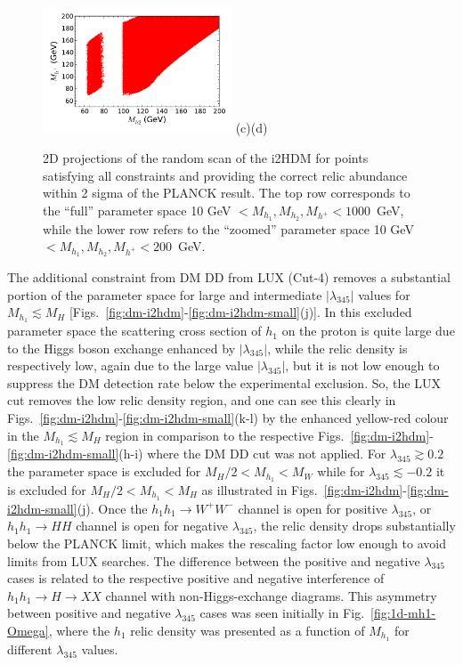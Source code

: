\documentclass[12pt,a4paper]{article}
\begin{document}
\begin{figure}[htb]
\hspace*{-0.2cm}\includegraphics[width=0.50\textwidth]{Mhc_Mh2_Omega_zoom-cut123456789_zz-monoc.pdf}
\vskip -0.8cm
\hspace*{1cm}(c)\hspace*{0.55\textwidth}\hspace*{-1.5cm}(d)
\caption{2D projections of the random scan of the i2HDM for points satisfying all constraints and providing the correct relic abundance within 2 sigma of the PLANCK result.
 The top row corresponds to the ``full'' parameter space 10 GeV $< M_{h_1}, M_{h_2}, M_{h^{+}} < 1000$~GeV,
 while the lower row refers to the ``zoomed'' parameter space
10 GeV $< M_{h_1}, M_{h_2}, M_{h^{+}} < 200$~GeV.}
\label{fig:dm-i2hdm-relic}
\end{figure}


The additional constraint from DM DD from LUX (Cut-4)
removes a substantial portion of the  parameter space for large and intermediate $|\lambda_{345}|$
values for $M_{h_1}\lesssim M_H$  [Figs.~\ref{fig:dm-i2hdm}-\ref{fig:dm-i2hdm-small}(j)].
In this excluded parameter space the scattering cross section of $h_1$ on the proton 
is quite large due to the Higgs boson exchange enhanced by $|\lambda_{345}|$, while the relic density is respectively low,
again due to the large value  $|\lambda_{345}|$, but it is not low enough to suppress
the DM detection rate below the experimental exclusion.
So, the LUX cut removes the low relic density region, 
and one can see this clearly in Figs.~\ref{fig:dm-i2hdm}-\ref{fig:dm-i2hdm-small}(k-l)
by the enhanced yellow-red colour in the $M_{h_1}\lesssim M_H$ region 
in comparison to the respective Figs.~\ref{fig:dm-i2hdm}-\ref{fig:dm-i2hdm-small}(h-i)
where the DM DD cut was not applied.
For $\lambda_{345} \gtrsim 0.2$ the parameter space is excluded
for $M_H/2<M_{h_1}<M_W$ while for  $\lambda_{345} \lesssim -0.2$
it is excluded for $M_H/2<M_{h_1}<M_H$ as illustrated in Figs.~\ref{fig:dm-i2hdm}-\ref{fig:dm-i2hdm-small}(j).
Once the $h_1 h_1 \to W^+ W^-$ channel is open for positive  $\lambda_{345}$,
or $h_1 h_1 \to H H$ channel is open for negative $\lambda_{345}$,
the relic density drops substantially below the PLANCK limit, which makes the rescaling factor 
low enough to avoid limits from LUX searches.
The difference between the positive and negative $\lambda_{345}$ cases
is related to the respective positive and negative interference of
$h_1 h_1 \to H \to X X$ channel with non-Higgs-exchange diagrams.
This asymmetry between positive and negative $\lambda_{345}$ cases was seen initially
in Fig.~\ref{fig:1d-mh1-Omega}, where the $h_1$ relic density was presented as a function 
of $M_{h_1}$ for different $\lambda_{345}$ values.
\end{document}
